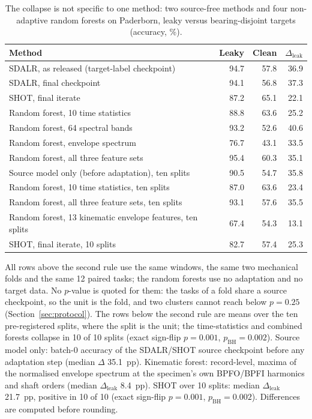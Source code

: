\begin{table}[htbp]
\centering
\caption{The collapse is not specific to one method: two source-free methods and four non-adaptive random forests on Paderborn, leaky versus bearing-disjoint targets (accuracy, \%).}
\label{tab:methods}
\begin{tabular}{lrrr}
\toprule
Method & Leaky & Clean & $\Delta_{\mathrm{leak}}$ \\
\midrule
SDALR, as released (target-label checkpoint) & 94.7 & 57.8 & 36.9 \\
SDALR, final checkpoint & 94.1 & 56.8 & 37.3 \\
SHOT, final iterate & 87.2 & 65.1 & 22.1 \\
\midrule
Random forest, 10 time statistics & 88.8 & 63.6 & 25.2 \\
Random forest, 64 spectral bands & 93.2 & 52.6 & 40.6 \\
Random forest, envelope spectrum & 76.7 & 43.1 & 33.5 \\
Random forest, all three feature sets & 95.4 & 60.3 & 35.1 \\
\midrule
Source model only (before adaptation), ten splits & 90.5 & 54.7 & 35.8 \\
Random forest, 10 time statistics, ten splits & 87.0 & 63.6 & 23.4 \\
Random forest, all three feature sets, ten splits & 93.1 & 57.6 & 35.5 \\
Random forest, 13 kinematic envelope features, ten splits & 67.4 & 54.3 & 13.1 \\
SHOT, final iterate, 10 splits & 82.7 & 57.4 & 25.3 \\
\bottomrule
\end{tabular}
\begin{minipage}{\linewidth}\vspace{2pt}\footnotesize All rows above the second rule use the same windows, the same two mechanical folds and the same 12 paired tasks; the random forests use no adaptation and no target data. No $p$-value is quoted for them: the tasks of a fold share a source checkpoint, so the unit is the fold, and two clusters cannot reach below $p = 0.25$ (Section~\ref{sec:protocol}). The rows below the second rule are means over the ten pre-registered splits, where the split is the unit; the time-statistics and combined forests collapse in 10 of 10 splits (exact sign-flip $p = 0.001$, $p_{\mathrm{BH}} = 0.002$). Source model only: batch-0 accuracy of the SDALR/SHOT source checkpoint before any adaptation step (median $\Delta$ 35.1~pp). Kinematic forest: record-level, maxima of the normalised envelope spectrum at the specimen's own BPFO/BPFI harmonics and shaft orders (median $\Delta_{\mathrm{leak}}$ 8.4~pp). SHOT over 10 splits: median $\Delta_{\mathrm{leak}}$ 21.7~pp, positive in 10 of 10 (exact sign-flip $p = 0.001$, $p_{\mathrm{BH}} = 0.002$). Differences are computed before rounding.\end{minipage}
\end{table}
